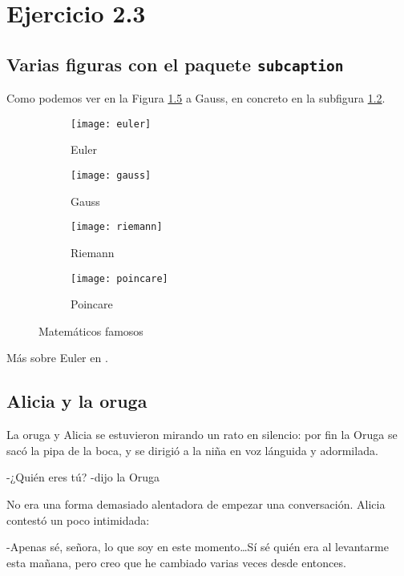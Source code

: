 \chapter{Ejercicio 2.3}

\section{Varias figuras con el paquete \texttt{subcaption}}
Como podemos ver en la Figura \ref{fig:matematicos} a Gauss, en concreto en la subfigura \ref{subfig:gauss}.

\begin{figure}[h]
    \centering
    \begin{subfigure}[t]{.24\linewidth} 
    \texttt{[image: euler]}
    \caption{Euler}\label{subfig:euler}
    \end{subfigure}
    \begin{subfigure}[t]{.24\linewidth} 
    \texttt{[image: gauss]}
    \caption{Gauss}\label{subfig:gauss}
    \end{subfigure}
    \begin{subfigure}[t]{.24\linewidth} 
    \texttt{[image: riemann]}
    \caption{Riemann}\label{subfig:riemann}
    \end{subfigure}
    \begin{subfigure}[t]{.24\linewidth} 
    \texttt{[image: poincare]}
    \caption{Poincare}\label{subfig:poincare}
    \end{subfigure}
    \caption{Matemáticos famosos}
    \label{fig:matematicos}
\end{figure}

Más sobre Euler en \cite{EulerWiki}.

\section{Alicia y la oruga}

La oruga y Alicia se estuvieron mirando un rato en silencio: por fin la Oruga se sacó la pipa de la boca, y se dirigió a la niña en voz lánguida y adormilada.

-¿Quién eres tú? -dijo la Oruga

No era una forma demasiado alentadora de empezar una conversación. Alicia contestó un poco intimidada:

-Apenas sé, señora, lo que soy en este momento\ldots Sí sé quién era al levantarme esta mañana, pero creo que he cambiado varias veces desde entonces.

